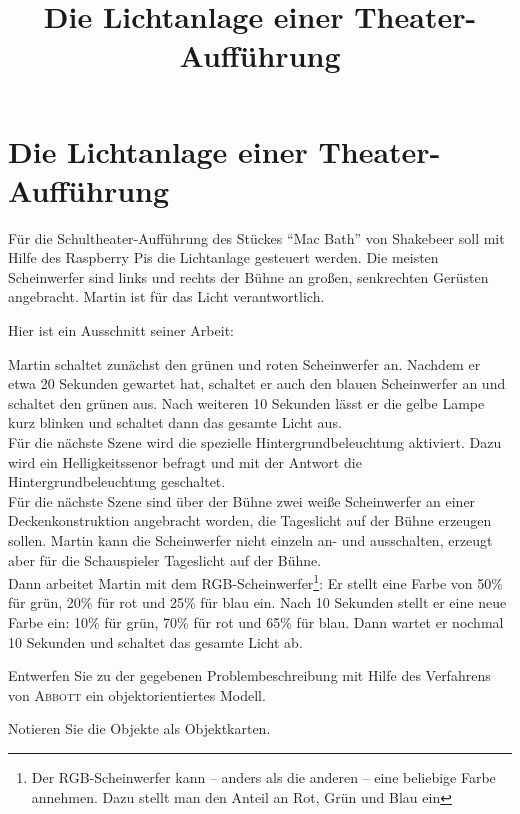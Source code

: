 \documentclass[11pt, a4paper]{scrartcl}
\title{Die Lichtanlage einer Theater-Aufführung}
\begin{document}
\section*{Die Lichtanlage einer Theater-Aufführung}
Für die Schultheater-Aufführung des Stückes \enquote{Mac Bath} von Shakebeer soll mit Hilfe des Raspberry Pis die Lichtanlage gesteuert werden. Die meisten Scheinwerfer sind links und rechts der Bühne an großen, senkrechten Gerüsten angebracht. Martin ist für das Licht verantwortlich. 

\vspace{0.5cm}

Hier ist ein Ausschnitt seiner Arbeit:

\begin{mdframed}
Martin schaltet zunächst den grünen und roten Scheinwerfer an. Nachdem er etwa 20 Sekunden gewartet hat, schaltet er auch den blauen Scheinwerfer an und schaltet den grünen aus. Nach weiteren 10 Sekunden lässt er die gelbe Lampe kurz blinken und schaltet dann das gesamte Licht aus.\\

Für die nächste Szene wird die spezielle Hintergrundbeleuchtung aktiviert. Dazu wird ein Helligkeitssenor befragt und mit der Antwort die Hintergrundbeleuchtung geschaltet.\\

Für die nächste Szene sind über der Bühne zwei weiße Scheinwerfer an einer Deckenkonstruktion angebracht worden, die Tageslicht auf der Bühne erzeugen sollen. Martin kann die Scheinwerfer nicht einzeln an- und ausschalten, erzeugt aber für die Schauspieler Tageslicht auf der Bühne.\\

Dann arbeitet Martin mit dem RGB-Scheinwerfer\footnote{Der RGB-Scheinwerfer kann -- anders als die anderen -- eine beliebige Farbe annehmen. Dazu stellt man den Anteil an Rot, Grün und Blau ein}: Er stellt eine Farbe von 50\% für grün, 20\% für rot und 25\% für blau ein. Nach 10 Sekunden stellt er eine neue Farbe ein: 10\% für grün, 70\% für rot und 65\% für blau. Dann wartet er nochmal 10 Sekunden und schaltet das gesamte Licht ab.\\
\end{mdframed}

\vfill

\begin{aufgabe}
Entwerfen Sie zu der gegebenen Problembeschreibung mit Hilfe des Verfahrens von \textsc{Abbott} ein objektorientiertes Modell. 
\end{aufgabe}

\begin{aufgabe}
Notieren Sie die Objekte als Objektkarten.
\end{aufgabe}
\end{document}
